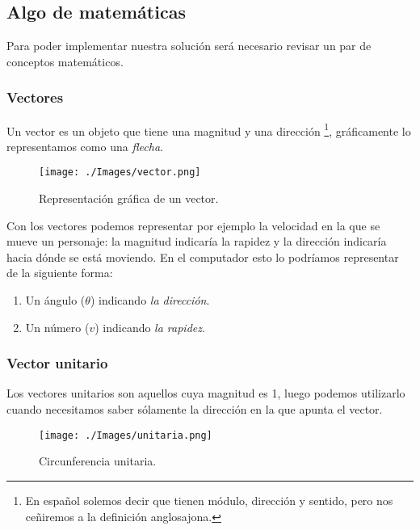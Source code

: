 \newpage
\clearpage

\newpage 
\subsection{Algo de matemáticas}

Para poder implementar nuestra solución será necesario revisar un par de conceptos matemáticos. 

\subsubsection{Vectores}

Un vector es un objeto que tiene una magnitud y una dirección \cite{introVectors} \footnote{En español solemos decir que tienen módulo, dirección y sentido, pero nos ceñiremos a la definición anglosajona.}, gráficamente lo representamos como una \emph{flecha}.
 
 \begin{figure}[h!]
 	\centering
 	\texttt{[image: ./Images/vector.png]}
 	\caption{Representación gráfica de un vector.}
 	\label{vector}
 \end{figure}

Con los vectores podemos representar por ejemplo la velocidad en la que se mueve un personaje: la magnitud indicaría la rapidez y la dirección indicaría hacia dónde se está moviendo. En el computador esto lo podríamos representar de la siguiente forma:

\begin{enumerate}
\item Un ángulo ($\theta$) indicando \emph{la dirección}.

\item Un número ($v$) indicando \emph{la rapidez}.
\end{enumerate}


\subsubsection{Vector unitario}

Los vectores unitarios son aquellos cuya magnitud es 1, luego podemos utilizarlo cuando necesitamos saber sólamente la dirección en la que apunta el vector.

\begin{figure}[h!]
	\centering
	\texttt{[image: ./Images/unitaria.png]}
	\caption{Circunferencia unitaria.}
	\label{unitaria}
\end{figure}


